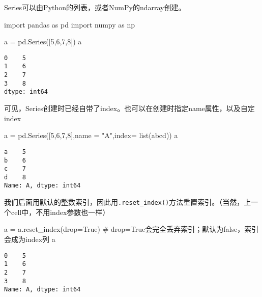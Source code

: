 \documentclass[
  letterpaper,
  DIV=11,
  numbers=noendperiod]{scrreprt}
\newenvironment{Shaded}{\begin{snugshade}}{\end{snugshade}}
\newcommand{\BuiltInTok}[1]{\textcolor[rgb]{0.00,0.23,0.31}{#1}}
\newcommand{\CommentTok}[1]{\textcolor[rgb]{0.37,0.37,0.37}{#1}}
\newcommand{\DecValTok}[1]{\textcolor[rgb]{0.68,0.00,0.00}{#1}}
\newcommand{\ImportTok}[1]{\textcolor[rgb]{0.00,0.46,0.62}{#1}}
\newcommand{\NormalTok}[1]{\textcolor[rgb]{0.00,0.23,0.31}{#1}}
\newcommand{\OperatorTok}[1]{\textcolor[rgb]{0.37,0.37,0.37}{#1}}
\newcommand{\StringTok}[1]{\textcolor[rgb]{0.13,0.47,0.30}{#1}}
\newcommand{\VariableTok}[1]{\textcolor[rgb]{0.07,0.07,0.07}{#1}}
\begin{document}
Series可以由Python的列表，或者NumPy的ndarray创建。

\begin{Shaded}
\begin{Highlighting}[]
\ImportTok{import}\NormalTok{ pandas }\ImportTok{as}\NormalTok{ pd}
\ImportTok{import}\NormalTok{ numpy }\ImportTok{as}\NormalTok{ np}

\NormalTok{a }\OperatorTok{=}\NormalTok{ pd.Series([}\DecValTok{5}\NormalTok{,}\DecValTok{6}\NormalTok{,}\DecValTok{7}\NormalTok{,}\DecValTok{8}\NormalTok{])}
\NormalTok{a}
\end{Highlighting}
\end{Shaded}

\begin{verbatim}
0    5
1    6
2    7
3    8
dtype: int64
\end{verbatim}

可见，Series创建时已经自带了index。也可以在创建时指定name属性，以及自定index

\begin{Shaded}
\begin{Highlighting}[]
\NormalTok{a }\OperatorTok{=}\NormalTok{ pd.Series([}\DecValTok{5}\NormalTok{,}\DecValTok{6}\NormalTok{,}\DecValTok{7}\NormalTok{,}\DecValTok{8}\NormalTok{],name }\OperatorTok{=} \StringTok{"A"}\NormalTok{,index}\OperatorTok{=} \BuiltInTok{list}\NormalTok{(}\StringTok{\textquotesingle{}abcd\textquotesingle{}}\NormalTok{))}
\NormalTok{a}
\end{Highlighting}
\end{Shaded}

\begin{verbatim}
a    5
b    6
c    7
d    8
Name: A, dtype: int64
\end{verbatim}

我们后面用默认的整数索引，因此用\texttt{.reset\_index()}方法重置索引。（当然，上一个cell中，不用index参数也一样）

\begin{Shaded}
\begin{Highlighting}[]
\NormalTok{a }\OperatorTok{=}\NormalTok{ a.reset\_index(drop}\OperatorTok{=}\VariableTok{True}\NormalTok{) }\CommentTok{\# drop=True会完全丢弃索引；默认为false，索引会成为index列}
\NormalTok{a}
\end{Highlighting}
\end{Shaded}

\begin{verbatim}
0    5
1    6
2    7
3    8
Name: A, dtype: int64
\end{verbatim}
\end{document}

